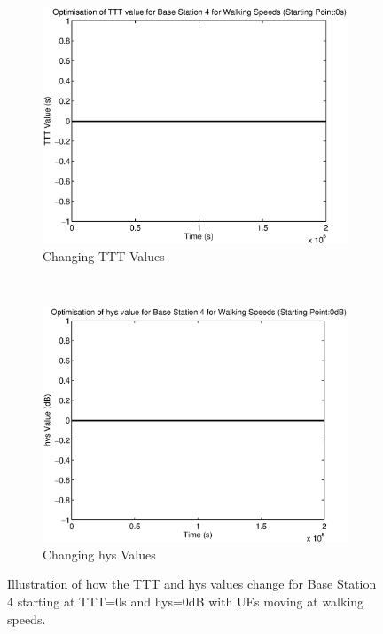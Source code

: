 \begin{figure}[H]
        \centering
        \begin{subfigure}[b]{0.49\textwidth}
                \includegraphics[width=\textwidth]{figures/graphs/walklow/TTT4.eps}
                \caption{Changing TTT Values}
        \end{subfigure}%
        ~ %
        \begin{subfigure}[b]{0.49\textwidth}
                \includegraphics[width=\textwidth]{figures/graphs/walklow/hys4.eps}
                \caption{Changing hys Values}
        \end{subfigure}
        \caption{Illustration of how the TTT and hys values change for Base Station 4 starting at TTT=0s and hys=0dB with UEs moving at walking speeds.}
\end{figure}
